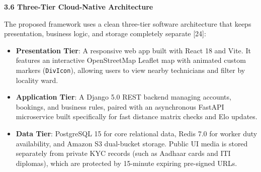 \documentclass[10pt,twocolumn,a4paper]{article}
\begin{document}
\vspace{0.8em}
\noindent
\textbf{3.6 Three-Tier Cloud-Native Architecture}

The proposed framework uses a clean three-tier software architecture that keeps presentation, business logic, and storage completely separate [24]:
\begin{itemize}
    \item \textbf{Presentation Tier}: A responsive web app built with React 18 and Vite. It features an interactive OpenStreetMap Leaflet map with animated custom markers (\texttt{DivIcon}), allowing users to view nearby technicians and filter by locality ward.
    \item \textbf{Application Tier}: A Django 5.0 REST backend managing accounts, bookings, and business rules, paired with an asynchronous FastAPI microservice built specifically for fast distance matrix checks and Elo updates.
    \item \textbf{Data Tier}: PostgreSQL 15 for core relational data, Redis 7.0 for worker duty availability, and Amazon S3 dual-bucket storage. Public UI media is stored separately from private KYC records (such as Aadhaar cards and ITI diplomas), which are protected by 15-minute expiring pre-signed URLs.
\end{itemize}
\end{document}
